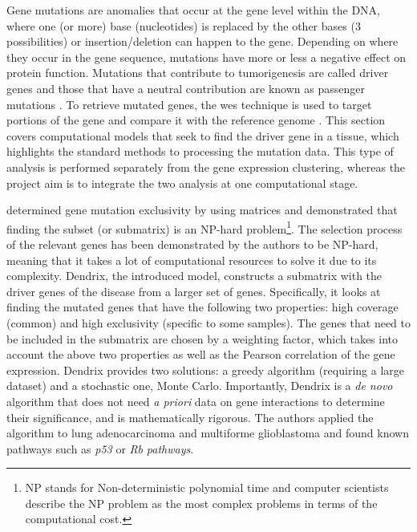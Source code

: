 Gene mutations are anomalies that occur at the gene level within the DNA, where one (or more) base (nucleotides) is replaced by the other bases (3 possibilities) or insertion/deletion can happen to the gene. Depending on where they occur in the gene sequence, mutations have more or less a negative effect on protein function. Mutations that contribute to tumorigenesis are called driver genes and those that have a neutral contribution are known as passenger mutations \citep{Ciriello2012-hi}. To retrieve mutated genes, the \acrlong{wes} technique is used to target portions of the gene and compare it with the reference genome \citep{Schneider2016-ml}. This section covers computational models that seek to find the driver gene in a tissue, which highlights the standard methods to processing the mutation data. This type of analysis is performed separately from the gene expression clustering, whereas the project aim is to integrate the two analysis at one computational stage.

\citet{Vandin2012-cf} determined gene mutation exclusivity by using matrices and demonstrated that finding the subset (or submatrix) is an NP-hard problem\footnote{NP stands for Non-deterministic polynomial time and computer scientists describe the NP problem as the most complex problems in terms of the computational cost.}. The selection process of the relevant genes has been demonstrated by the authors to be NP-hard, meaning that it takes a lot of computational resources to solve it due to its complexity. Dendrix, the introduced model, constructs a submatrix with the driver genes of the disease from a larger set of genes. Specifically, it looks at finding the mutated genes that have the following two properties: high coverage (common) and high exclusivity (specific to some samples). The genes that need to be included in the submatrix are chosen by a weighting factor, which takes into account the above two properties as well as the Pearson correlation of the gene expression. Dendrix provides two solutions: a greedy algorithm (requiring a large dataset) and a stochastic one, Monte Carlo. Importantly, Dendrix is a \textit{de novo} algorithm that does not need \textit{a priori} data on gene interactions to determine their significance, and is mathematically rigorous. The authors applied the algorithm to lung adenocarcinoma and multiforme glioblastoma and found known pathways such as \textit{p53} or \textit{Rb pathways}.


